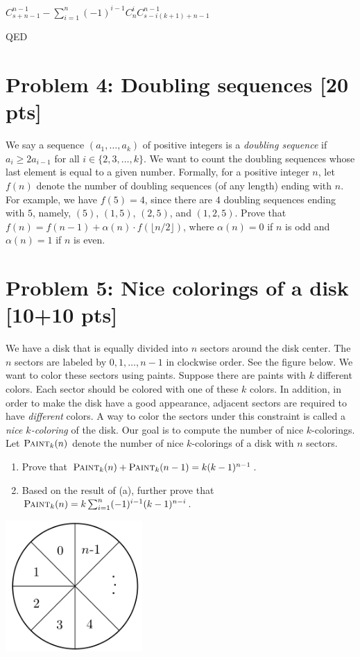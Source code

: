 \documentclass[11pt,twoside]{article}
\newcommand{\problem}[1]{\section*{Problem #1}}
\begin{document}
$C^{n-1}_{s+n-1}-\sum ^n_{i=1} (-1)^{i-1 } C^i_nC^{n-1}_{s-i(k+1)+n-1}$

QED


\problem{4: Doubling sequences [20 pts]} 
We say a sequence $(a_1,\dots,a_k)$ of positive integers is a \textit{doubling sequence} if $a_i \geq 2a_{i-1}$ for all $i \in \{2,3,\dots,k\}$.
We want to count the doubling sequences whose last element is equal to a given number.
Formally, for a positive integer $n$, let $f(n)$ denote the number of doubling sequences (of any length) ending with $n$.
For example, we have $f(5) = 4$, since there are $4$ doubling sequences ending with $5$, namely, $(5)$, $(1,5)$, $(2,5)$, and $(1,2,5)$.
Prove that $f(n) = f(n-1) + \alpha(n) \cdot f(\lfloor n/2 \rfloor)$, where $\alpha(n) = 0$ if $n$ is odd and $\alpha(n) = 1$ if $n$ is even.

\problem{5: Nice colorings of a disk [10+10 pts]} 
We have a disk that is equally divided into $n$ sectors around the disk center.
The $n$ sectors are labeled by $0,1,\dots,n-1$ in clockwise order.
See the figure below.
We want to color these sectors using paints.
Suppose there are paints with $k$ different colors.
Each sector should be colored with one of these $k$ colors.
In addition, in order to make the disk have a good appearance, adjacent sectors are required to have \textit{different} colors.
A way to color the sectors under this constraint is called a \textit{nice $k$-coloring} of the disk.
Our goal is to compute the number of nice $k$-colorings.
Let $\textsc{Paint}_k(n)$ denote the number of nice $k$-colorings of a disk with $n$ sectors.
\begin{enumerate}
    \item Prove that $\textsc{Paint}_k(n) + \textsc{Paint}_k(n-1) = k(k-1)^{n-1}$.
    \item Based on the result of (a), further prove that $\textsc{Paint}_k(n) = k \sum_{i=1}^{n} (-1)^{i-1} (k-1)^{n-i}$.
\end{enumerate}

\begin{center}
    \includegraphics[height=5cm]{hw-fig-sector.jpg}
\end{center}
\end{document}
